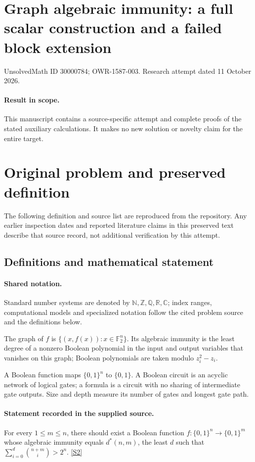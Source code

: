 \documentclass[11pt]{article}
\begin{document}
\section*{Graph algebraic immunity: a full scalar construction and a failed block extension}
\noindent UnsolvedMath ID 30000784; OWR-1587-003. Research attempt dated 11 October 2026.
\paragraph{Result in scope.}This manuscript contains a source-specific attempt and complete proofs of the stated auxiliary calculations. It makes no new solution or novelty claim for the entire target.
\section{Original problem and preserved definition}
The following definition and source list are reproduced from the repository. Any earlier inspection dates and reported literature claims in this preserved text describe that source record, not additional verification by this attempt.
\subsection{Definitions and mathematical statement}

\paragraph{Shared notation.}Standard number systems are denoted by $\mathbb N,\mathbb Z,\mathbb Q,\mathbb R,\mathbb C$; index ranges, computational models and specialized notation follow the cited problem source and the definitions below.


The graph of $f$ is $\{(x,f(x)):x\in\mathbb F_2^n\}$. Its algebraic immunity is the least degree of a nonzero Boolean polynomial in the input and output variables that vanishes on this graph; Boolean polynomials are taken modulo $z_i^2-z_i$.

A Boolean function maps $\{0,1\}^n$ to $\{0,1\}$. A Boolean circuit is an acyclic network of logical gates; a formula is a circuit with no sharing of intermediate gate outputs. Size and depth measure its number of gates and longest gate path.
\paragraph{Statement recorded in the supplied source.}
For every $1\leq m\leq n$, there should exist a Boolean function $f:\{0,1\}^n\to\{0,1\}^m$ whose algebraic immunity equals $d^*(n,m)$, the least $d$ such that $\sum_{i=0}^d\binom{n+m}{i}>2^n$. \href{https://doi.org/10.4171/owr/2007/31}{[S2]}
\end{document}
